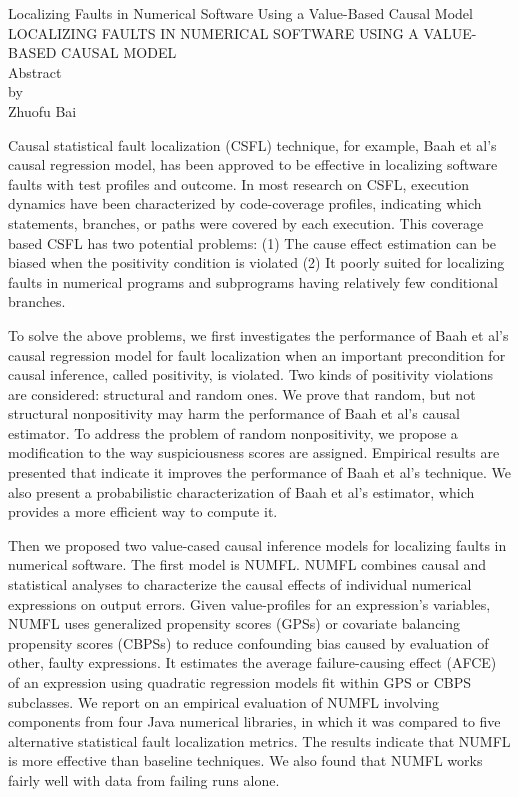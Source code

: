 \newpage
\begin{centering}
  Localizing Faults in Numerical Software Using a Value-Based Causal Model
  LOCALIZING FAULTS IN NUMERICAL SOFTWARE USING A VALUE-BASED CAUSAL MODEL\\
  \vspace{1cm}
  Abstract\\
  by\\
  \vspace{1cm}
  Zhuofu Bai\\
  \vspace{1cm}
\end{centering}



Causal statistical fault localization (CSFL) technique, for example, Baah et al’s causal regression model, has been approved to be effective in localizing software faults with test profiles and outcome. In most research on CSFL, execution dynamics have been characterized by code-coverage profiles, indicating which statements, branches, or paths were covered by each execution. This coverage based CSFL has two potential problems: (1) The cause effect estimation can be biased when the positivity condition is violated  (2) It poorly suited for localizing faults in numerical programs and subprograms having relatively few conditional branches. 

To solve the above problems, we first investigates the performance of Baah et al’s causal regression model for fault localization when an important precondition for causal inference, called positivity, is violated.  Two kinds of positivity violations are considered: structural and random ones.  We prove that random, but not structural nonpositivity may harm the performance of Baah et al’s causal estimator.  To address the problem of random nonpositivity, we propose a modification to the way suspiciousness scores are assigned.  Empirical results are presented that indicate it improves the performance of Baah et al’s technique. We also present a probabilistic characterization of Baah et al’s estimator, which provides a more efficient way to compute it.

Then we proposed two value-cased causal inference models for localizing faults in numerical software. The first model is NUMFL. NUMFL combines causal and statistical analyses to characterize the causal effects of individual numerical expressions on output errors.  Given value-profiles for an expression's variables, NUMFL uses generalized propensity scores (GPSs) or covariate balancing propensity scores (CBPSs) to reduce confounding bias caused by evaluation of other, faulty expressions.  It estimates the average failure-causing effect (AFCE) of an expression using quadratic regression models fit within GPS or CBPS subclasses.  We report on an empirical evaluation of NUMFL involving components from four Java numerical libraries, in which it was compared to five alternative statistical fault localization metrics.  The results indicate that NUMFL is more effective than baseline techniques. We also found that NUMFL works fairly well with data from failing runs alone. 


